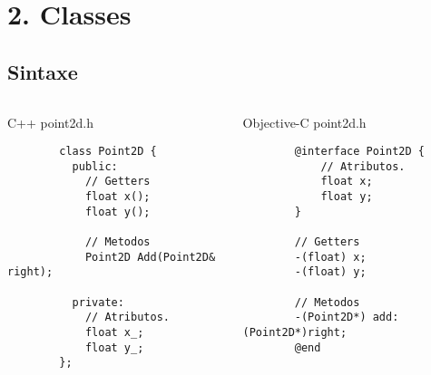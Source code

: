 \documentclass[brazil]{beamer}
\begin{document}
\section{2. Classes}

\subsection{Sintaxe}

\begin{frame}[fragile]
  \begin{columns}
    \begin{column}{.5\textwidth}
      \begin{center}
        C++
        \vfill
        point2d.h
        \vfill
      \end{center}
      \lstset{language=C++,basicstyle=\tiny}
      \begin{lstlisting}
        class Point2D {
          public:
            // Getters
            float x();
            float y();

            // Metodos
            Point2D Add(Point2D& right);

          private:
            // Atributos.
            float x_;
            float y_;
        };
      \end{lstlisting}
    \end{column}
    \begin{column}{.5\textwidth}
      \begin{center}
        Objective-C
        \vfill
        point2d.h
        \vfill
      \end{center}
      \lstset{language=C++,basicstyle=\tiny}
      \begin{lstlisting}
        @interface Point2D {
            // Atributos.
            float x;
            float y;
        }

        // Getters
        -(float) x;
        -(float) y;
        
        // Metodos
        -(Point2D*) add: (Point2D*)right;
        @end
      \end{lstlisting}
    \end{column}
  \end{columns}
\end{frame}
\end{document}
